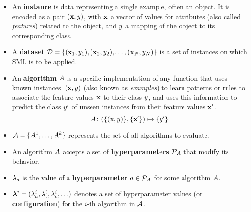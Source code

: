 	\begin{itemize}
		\item
		An {\bf instance} is data representing a single example, often an object. It is encoded as a pair $(\mathbf{x}, y)$,
		with $\mathbf{x}$ a vector of values for attributes (also called \emph{features}) related to
		the object, and $y$ a mapping of the object to its corresponding class.
		
		\item
		A {\bf dataset} $\mathcal{D} = \{(\mathbf{x}_1, y_1), (\mathbf{x}_2, y_2), \ldots,
		(\mathbf{x}_N, y_N)\}$ is a set of instances on which SML is to be applied.

		\item
		An {\bf algorithm} $A$ is a specific implementation of any function that uses known
		instances~$(\mathbf{x}, y)$ (also known as \emph{examples}) to learn patterns or rules to
		associate the feature values $\mathbf{x}$ to their class $y$, and uses this
		information to predict the class $y'$ of unseen instances from their feature values
		$\mathbf{x}'$.
		\begin{equation}
			\label{eq:sml_alg}
			A \colon (\{(\mathbf{x}, y)\}, \{\mathbf{x}'\}) \mapsto \{y'\}
		\end{equation}

		\item
		$\mathcal{A} = \{A^1, \ldots, A^k\}$ represents the set of all algorithms to evaluate.
		
		\item
		An algorithm $A$ accepts a set of {\bf hyperparameters} $\mathcal{P}_A$ that modify
		its behavior.

		\item
		$\lambda_a$ is the value of a {\bf hyperparameter} $a \in \mathcal{P}_A$ for some
		algorithm $A$.

		\item
		$\boldsymbol{\lambda}^i = (\lambda^i_a, \lambda^i_b, \lambda^i_c,\ldots)$ denotes a set of
		hyperparameter values (or {\bf configuration}) for the $i$-th algorithm in $\mathcal{A}$.
		

\end{itemize}
